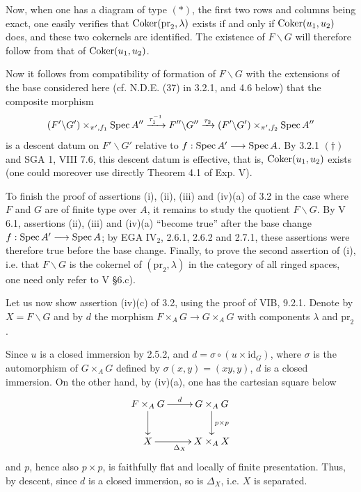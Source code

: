 Now, when one has a diagram of type $(*)$, the first two rows and columns being exact, one easily verifies that $\operatorname{Coker}(\mathrm{pr}_2,\lambda)$ exists if and only if $\operatorname{Coker}(u_1,u_2)$ does, and these two cokernels are identified. The existence of $F\backslash G$ will therefore follow from that of $\operatorname{Coker}(u_1,u_2)$.

Now it follows from compatibility of formation of $F\backslash G$ with the extensions of the base considered here (cf. N.D.E. (37) in 3.2.1, and 4.6 below) that the composite morphism
\[
(F'\backslash G')\times_{\pi',f_1}\operatorname{Spec} A''\xrightarrow{\tau_1^{-1}}F''\backslash G''\xrightarrow{\tau_2}(F'\backslash G')\times_{\pi',f_2}\operatorname{Spec} A''
\]
is a descent datum on $F'\backslash G'$ relative to $f:\operatorname{Spec} A'\longrightarrow\operatorname{Spec} A$. By 3.2.1 $(\dagger)$ and SGA 1, VIII 7.6, this descent datum is effective, that is, $\operatorname{Coker}(u_1,u_2)$ exists (one could moreover use directly Theorem 4.1 of Exp. V).

To finish the proof of assertions (i), (ii), (iii) and (iv)(a) of 3.2 in the case where $F$ and $G$ are of finite type over $A$, it remains to study the quotient $F\backslash G$. By V 6.1, assertions (ii), (iii) and (iv)(a) ``become true'' after the base change $f:\operatorname{Spec} A'\longrightarrow\operatorname{Spec} A$; by EGA IV$_2$, 2.6.1, 2.6.2 and 2.7.1, these assertions were therefore true before the base change. Finally, to prove the second assertion of (i), i.e. that $F\backslash G$ is the cokernel of $(\mathrm{pr}_2,\lambda)$ in the category of all ringed spaces, one need only refer to V §6.c).

Let us now show assertion (iv)(c) of 3.2, using the proof of VIB, 9.2.1. Denote by $X=F\backslash G$ and by $d$ the morphism $F\times_AG\to G\times_AG$ with components $\lambda$ and $\mathrm{pr}_2$.

Since $u$ is a closed immersion by 2.5.2, and $d=\sigma\circ(u\times\mathrm{id}_G)$, where $\sigma$ is the automorphism of $G\times_AG$ defined by $\sigma(x,y)=(xy,y)$, $d$ is a closed immersion. On the other hand, by (iv)(a), one has the cartesian square below
\[
\xymatrix{F\times_AG\ar[r]^d\ar[d]&G\times_AG\ar[d]^{p\times p}\\X\ar[r]_{\Delta_X}&X\times_AX}
\]
and $p$, hence also $p\times p$, is faithfully flat and locally of finite presentation. Thus, by \fppf descent, since $d$ is a closed immersion, so is $\Delta_X$, i.e. $X$ is separated.

